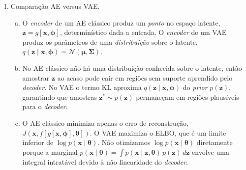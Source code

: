\documentclass{dlproblemset}
\newcommand{\thetav}{\boldsymbol{\theta}}
\begin{document}
\begin{enumerate}[I)]
    \item Comparação AE versus VAE.
    \begin{enumerate}[(a)]
        \item O \textit{encoder} de um AE clássico produz um \emph{ponto} no espaço latente, $\mathbf{z} = g[\mathbf{x}, \boldsymbol{\phi}]$, determinístico dada a entrada. O \textit{encoder} de um VAE produz os parâmetros de uma \emph{distribuição} sobre o latente, $q(\mathbf{z} \mid \mathbf{x}, \boldsymbol{\phi}) = \mathcal{N}(\boldsymbol{\mu}, \boldsymbol{\Sigma})$.
        \item No AE clássico não há uma distribuição conhecida sobre o latente, então amostrar $\mathbf{z}$ ao acaso pode cair em regiões sem suporte aprendido pelo \textit{decoder}. No VAE o termo KL aproxima $q(\mathbf{z} \mid \mathbf{x}, \boldsymbol{\phi})$ do \textit{prior} $p(\mathbf{z})$, garantindo que amostras $\mathbf{z}^{*} \sim p(\mathbf{z})$ permaneçam em regiões plausíveis para o \textit{decoder}.
        \item O AE clássico minimiza apenas o erro de reconstrução, $J(\mathbf{x}, f[g[\mathbf{x}, \boldsymbol{\phi}], \thetav])$. O VAE maximiza o ELBO, que é um limite inferior de $\log p(\mathbf{x} \mid \thetav)$. Não otimizamos $\log p(\mathbf{x} \mid \thetav)$ diretamente porque a marginal $p(\mathbf{x} \mid \thetav) = \int p(\mathbf{x} \mid \mathbf{z}, \thetav)\,p(\mathbf{z})\,d\mathbf{z}$ envolve uma integral intratável devido à não linearidade do \textit{decoder}.
    \end{enumerate}


\end{enumerate}
\end{document}
